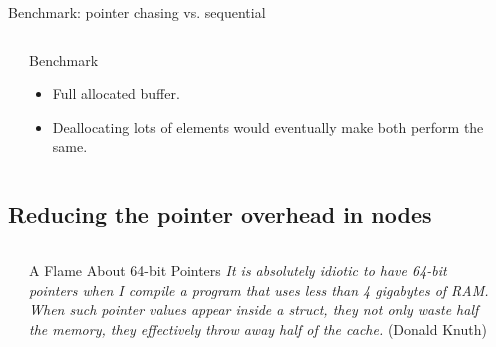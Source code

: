 \documentclass[10pt,aspectratio=169]{beamer}
\begin{document}
\begin{frame}[fragile]
{Benchmark: pointer chasing vs. sequential}
\begin{columns}
\begin{column}{0.47\textwidth}


\end{column}

\begin{column}{0.47\textwidth}
\begin{block} {Benchmark}
\begin{itemize}
\item Full allocated buffer.
\item Deallocating lots of elements would eventually
make both perform the same.
\end{itemize}
\end{block}
\end{column}
\end{columns}
\end{frame}

\subsection{Reducing the pointer overhead in nodes}

\begin{frame}[fragile]
{}

\begin{columns}
\begin{column}{0.10\textwidth}
\end{column}
\begin{column}{0.80\textwidth}
\begin{block}{A Flame About 64-bit Pointers}
{ \it \noindent
It is absolutely idiotic to have 64-bit pointers when I compile a
program that uses less than 4 gigabytes of RAM. When such pointer
values appear inside a struct, they not only waste half the memory,
they effectively throw away half of the cache.}  \hfill (Donald Knuth)
\end{block}
\end{column}
\begin{column}{0.10\textwidth}
\end{column}
\end{columns}
\end{frame}
\end{document}
